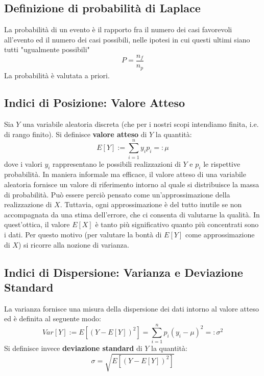 \subsection{Definizione di probabilità di Laplace}
La probabilità di un evento è il rapporto fra il numero dei casi favorevoli all'evento ed il numero dei casi possibili, nelle ipotesi in cui questi ultimi siano tutti "ugualmente possibili"
\begin{equation}
	P=\frac{n_f}{n_p}
\end{equation}
La probabilità è valutata a priori.


\subsection{Indici di Posizione: Valore Atteso}
Sia $Y$ una variabile aleatoria discreta (che per i nostri scopi intendiamo finita, i.e. di rango finito). Si definisce \textbf{valore atteso} di $Y$ la quantità:
\begin{equation}
	E[Y] := \sum_{i=1}^{n} y_i p_i =: \mu
\end{equation}
dove i valori $y_i$ rappresentano le possibili realizzazioni di $Y$ e $p_i$ le rispettive probabilità. In maniera informale ma efficace, il valore atteso di una variabile aleatoria fornisce un valore di riferimento intorno al quale si distribuisce la massa di probabilità. Può essere perciò pensato come un'approssimazione della realizzazione di $X$. Tuttavia, ogni approssimazione è del tutto inutile se non accompagnata da una stima dell'errore, che ci consenta di valutarne la qualità. In quest'ottica, il valore $E[X]$ è tanto più significativo quanto più concentrati sono i dati. Per questo motivo (per valutare la bontà di $E[Y]$ come approssimazione di $X$) si ricorre alla nozione di varianza.
\subsection{Indici di Dispersione: Varianza e Deviazione Standard}
La varianza fornisce una misura della dispersione dei dati intorno al valore atteso ed è definita al seguente modo:
\begin{equation}
	Var[Y] := E[(Y-E[Y])^2]= \sum_{i=1}^{n}p_i(y_i - \mu)^2 =: \sigma^2
\end{equation}
Si definisce invece \textbf{deviazione standard} di $Y$ la quantità:
\begin{equation}
	\sigma = \sqrt{E[(Y-E[Y])^2]}
\end{equation}


